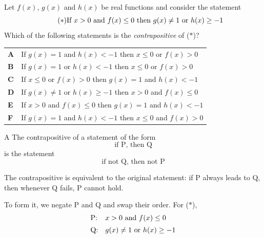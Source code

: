 \documentclass[11pt,a4paper]{article}
\begin{document}
\begin{enumerate}[label=\textbf{\arabic*.},leftmargin=*,itemsep=0pt,start=2]
\questionitem[Logic]
Let $f(x),\, g(x)$ and $h(x)$ be real functions and consider the statement \begin{equation}\tag{$\ast$} \text{If $x>0$ and $f(x)\le 0$ then $g(x)\neq 1$ or $h(x)\ge -1$}\\[5pt] \end{equation} Which of the following statements is the \textit{contrapositive} of ($\ast$)?

\par\vspace*{12pt}
\begin{tabularx}{\linewidth}{@{}>{\bfseries}l Y@{}}
A &
If $g(x) = 1$ and $h(x) < -1$ then $x \le 0$ or $f(x) > 0$
\\[0.8em]
B &
If $g(x) = 1$ or $h(x) < -1$ then $x \le 0$ or $f(x) > 0$
\\[0.8em]
C &
If $x \le 0$ or $f(x) > 0$ then $g(x) = 1$ and $h(x) < -1$
\\[0.8em]
D &
If $g(x) \neq 1$ or $h(x) \ge -1$ then $x > 0$ and $f(x) \le 0$
\\[0.8em]
E &
If $x > 0$ and $f(x) \le 0$ then $g(x) = 1$ and $h(x) < -1$
\\[0.8em]
F &
If $g(x) = 1$ and $h(x) < -1$ then $x \le 0$ and $f(x) > 0$
\\
\end{tabularx}

\begin{djsSolution}{A}
The contrapositive of a statement of the form
\[
\text{if P, then Q}
\]
is the statement
\[
\text{if not Q, then not P}
\]

The contrapositive is equivalent to the original statement: if P always leads to Q, then whenever Q fails, P cannot hold.

To form it, we negate P and Q and swap their order. For ($\ast$),
\[
\begin{array}{@{}ll@{}}
\text{P:} & x>0\text{ and }f(x)\le0\\[5pt]
\text{Q:} & g(x)\neq1\text{ or }h(x)\ge-1
\end{array}
\]


\end{djsSolution}
\end{enumerate}
\end{document}
